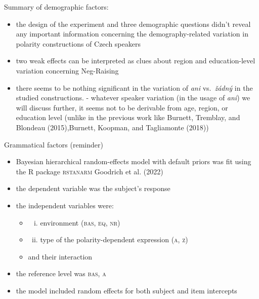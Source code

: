 \documentclass[
  ignorenonframetext,
]{beamer}
\providecommand{\tightlist}{%
  \setlength{\itemsep}{0pt}\setlength{\parskip}{0pt}}\usepackage{longtable,booktabs,array}
\begin{document}
\begin{frame}
Summary of demographic factors:

\begin{itemize}
\tightlist
\item
  the design of the experiment and three demographic questions didn't
  reveal any important information concerning the demography-related
  variation in polarity constructions of Czech speakers
\item
  two weak effects can be interpreted as clues about region and
  education-level variation concerning Neg-Raising
\item
  there seems to be nothing significant in the variation of \textit{ani}
  vs.~\textit{žádný} in the studied constructions. - whatever speaker
  variation (in the usage of \textit{ani}) we will discuss further, it
  seems not to be derivable from age, region, or education level (unlike
  in the previous work like Burnett, Tremblay, and Blondeau
  (2015),Burnett, Koopman, and Tagliamonte (2018))
\end{itemize}
\end{frame}

\begin{frame}
\begin{block}{Grammatical factors}
\protect\hypertarget{grammatical-factors}{}
(reminder)

\begin{itemize}
\tightlist
\item
  Bayesian hierarchical random-effects model with default priors was fit
  using the R package \textsc{rstanarm} Goodrich et al. (2022)
\item
  the dependent variable was the subject's response
\item
  the independent variables were:

  \begin{itemize}
  \item
    \begin{enumerate}
    [(i)]
    \tightlist
    \item
      environment (\textsc{bas, eq, nr})
    \end{enumerate}
  \item
    \begin{enumerate}
    [(i)]
    \setcounter{enumi}{1}
    \tightlist
    \item
      type of the polarity-dependent expression (\textsc{a, z})
    \end{enumerate}
  \item
    and their interaction
  \end{itemize}
\item
  the reference level was \textsc{bas, a}
\item
  the model included random effects for both subject and item intercepts
\end{itemize}
\end{block}
\end{frame}
\end{document}

